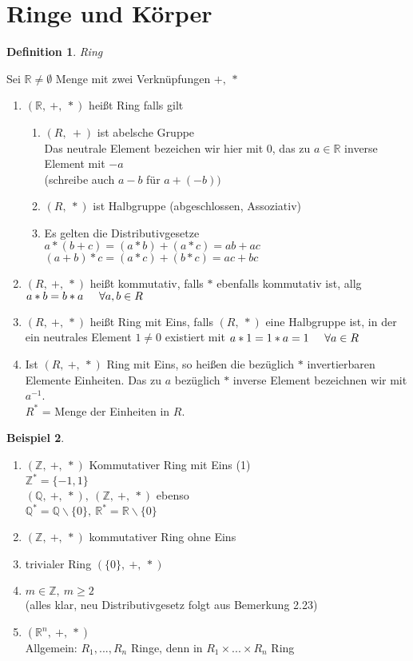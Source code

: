 \documentclass[a4paper,11pt]{article}
\newtheorem{definition}{Definition}[section]
\newtheorem{bsp}[definition]{Beispiel}
\begin{document}
\section{Ringe und Körper}
\begin{definition}
Ring
\end{definition}
Sei $\mathbb{R}\neq\emptyset$ Menge mit zwei Verknüpfungen $+,\:*$
\begin{enumerate}[label=\alph*)]
\item $(\mathbb{R},\:+,\:*)$ heißt Ring falls gilt
\begin{enumerate}[label=(\arabic*)]
\item $(R,\:+)$ ist abelsche Gruppe \\
Das neutrale Element bezeichen wir hier mit 0, das zu $a\in\mathbb{R}$ inverse Element mit $-a$ \\
(schreibe auch $a-b$ für $a+(-b))$
\item $(R,\:*)$ ist Halbgruppe (abgeschlossen, Assoziativ)
\item Es gelten die Distributivgesetze \\
$a*(b+c)=(a*b)+(a*c)=ab+ac$ \\
$(a+b)*c=(a*c)+(b*c)=ac+bc$
\end{enumerate}
\item $(R,\:+,\:*)$ heißt kommutativ, falls $*$ ebenfalls kommutativ ist, allg $a*b=b*a\hspace{5mm}\forall a,b\in R$
\item $(R,\:+,\:*)$ heißt Ring mit Eins, falls $(R,\:*)$ eine Halbgruppe ist, in der ein neutrales Element $1\neq 0$ existiert mit $a*1=1*a=1\hspace{5mm}\forall a\in R$
\item Ist $(R,\:+,\:*)$ Ring mit Eins, so heißen die bezüglich $*$ invertierbaren Elemente Einheiten. Das zu $a$ bezüglich $*$ inverse Element bezeichnen wir mit $a^{-1}$. \\
$R^*$ = Menge der Einheiten in $R$.
\end{enumerate}
\begin{bsp}
\end{bsp}
\begin{enumerate}[label=\alph*)]
\item $(\mathbb{Z},\:+,\:*)$ Kommutativer Ring mit Eins (1) \\
$\mathbb{Z}^*=\{-1,1\}$ \\
$(\mathbb{Q},\:+,\:*),\:(\mathbb{Z},\:+,\:*)$ ebenso \\
$\mathbb{Q}^*=\mathbb{Q}\backslash\{0\},\:\mathbb{R}^*=\mathbb{R}\backslash\{0\}$
\item $(\mathbb{Z},\:+,\:*)$ kommutativer Ring ohne Eins
\item trivialer Ring $(\{0\},\:+,\:*)$
\item $m\in\mathbb{Z},\:m\geq 2$ \\
(alles klar, neu Distributivgesetz folgt aus Bemerkung 2.23)
\item $(\mathbb{R}^n,\:+,\:*)$ \\
Allgemein: $R_1,...,R_n$ Ringe, denn in $R_1\times...\times R_n$ Ring
\end{enumerate}
\end{document}
